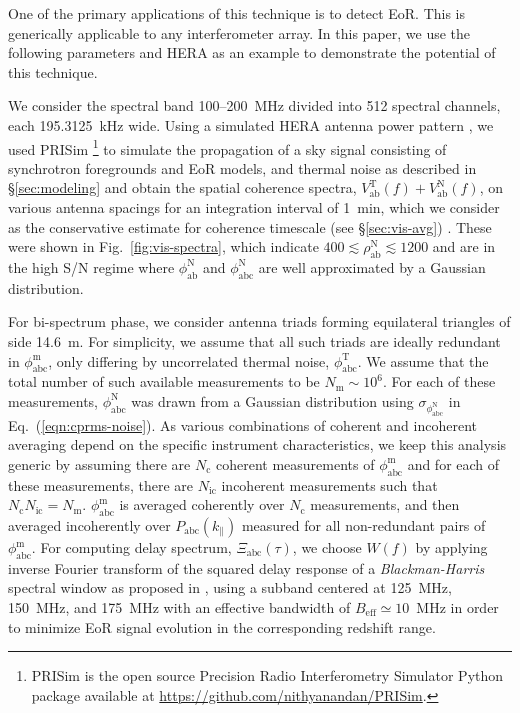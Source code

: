 \documentclass[
reprint,
superscriptaddress,
amsmath,
amssymb,
aps,
]{revtex4-1}
\begin{document}
One of the primary applications of this technique is to detect EoR. This is generically applicable to any interferometer array. In this paper, we use the following parameters and HERA as an example to demonstrate the potential of this technique.

We consider the spectral band 100--200~MHz divided into 512 spectral channels, each 195.3125~kHz wide. Using a simulated HERA antenna power pattern \cite{deb17}, we used PRISim \footnote{PRISim is the open source Precision Radio Interferometry Simulator Python package available at \href{https://github.com/nithyanandan/PRISim}{https://github.com/nithyanandan/PRISim}.} to simulate the propagation of a sky signal consisting of synchrotron foregrounds and EoR models, and thermal noise as described in \S\ref{sec:modeling} and obtain the spatial coherence spectra, $V_\textrm{ab}^\textrm{T}(f) + V_\textrm{ab}^\textrm{N}(f)$, on various antenna spacings for an integration interval of 1~min, which we consider as the conservative estimate for coherence timescale (see \S\ref{sec:vis-avg}) \cite{car18}. These were shown in Fig.~\ref{fig:vis-spectra}, which indicate $400\lesssim \rho_\textrm{ab}^\textrm{N} \lesssim 1200$ and are in the high S/N regime where $\phi_\textrm{ab}^\textrm{N}$ and $\phi_\textrm{abc}^\textrm{N}$ are well approximated by a Gaussian distribution. 

For bi-spectrum phase, we consider antenna triads forming equilateral triangles of side 14.6~m. For simplicity, we assume that all such triads are ideally redundant in $\phi_\textrm{abc}^\textrm{m}$, only differing by uncorrelated thermal noise, $\phi_\textrm{abc}^\textrm{T}$. We assume that the total number of such available measurements to be $N_\textrm{m} \sim 10^6$. For each of these measurements, $\phi_\textrm{abc}^\textrm{N}$ was drawn from a Gaussian distribution using $\sigma_{\phi_\textrm{abc}^\textrm{N}}$ in Eq.~(\ref{eqn:cprms-noise}). As various combinations of coherent and incoherent averaging depend on the specific instrument characteristics, we keep this analysis generic by assuming there are $N_\textrm{c}$ coherent measurements of $\phi_\textrm{abc}^\textrm{m}$ and for each of these measurements, there are $N_\textrm{ic}$ incoherent measurements such that $N_\textrm{c}N_\textrm{ic}=N_\textrm{m}$. $\phi_\textrm{abc}^\textrm{m}$ is averaged coherently over $N_\textrm{c}$ measurements, and then averaged incoherently over $P_\textrm{abc}(k_\parallel)$ measured for all non-redundant pairs of $\phi_\textrm{abc}^\textrm{m}$. For computing delay spectrum, $\Xi_\textrm{abc}(\tau)$, we choose $W(f)$ by applying inverse Fourier transform of the squared delay response of a {\it Blackman-Harris} spectral window \cite{har78} as proposed in \cite{thy16}, using a subband centered at 125~MHz, 150~MHz, and 175~MHz with an effective bandwidth of $B_\textrm{eff}\simeq 10$~MHz in order to minimize EoR signal evolution in the corresponding redshift range.
\end{document}

